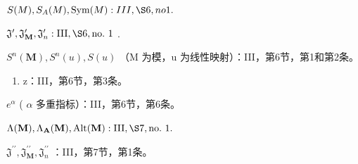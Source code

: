 \(S(M), S_{A}(M), \text{Sym}(M): III, \S 6, no 1.\)

\(\mathfrak{J}^{\prime}, \mathfrak{J}_{\mathbf{M}}^{\prime}, \mathfrak{J}_{n}^{\prime}: \mathrm{III}, \S 6, \mathrm{no.~1}\) .

\(S^{n}(\mathbf{M}), S^{n}(u), S(u)\) （M 为模，u 为线性映射）：III，第6节，第1和第2条。

\begin{enumerate}
\def\labelenumi{\alph{enumi}.}
\setcounter{enumi}{18}
\tightlist
\item
  z：III，第6节，第3条。
\end{enumerate}

\(e^{\alpha}\) ( \(\alpha\) 多重指标）：III，第6节，第6条。

\(\Lambda (\mathbf{M}),\Lambda_{\mathbf{A}}(\mathbf{M}),\mathrm{Alt}(\mathbf{M}):\mathrm{III},\S 7,\mathrm{no.~1.}\)

\(\mathfrak{J}^{\prime \prime},\mathfrak{J}_{\mathbf{M}}^{\prime \prime},\mathfrak{J}_{n}^{\prime \prime}\) ：III，第7节，第1条。


